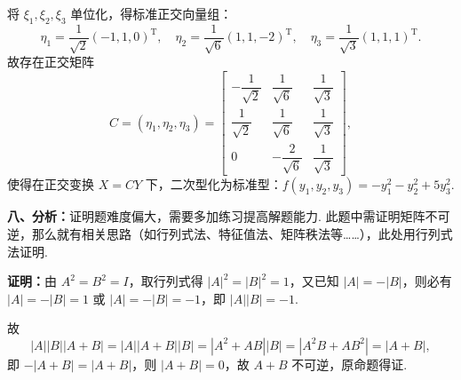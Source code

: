 \documentclass[a4paper,11pt]{ctexart}
\newcommand{\T}{\mathrm{T}}
\begin{document}
将 $\xi_1, \xi_2, \xi_3$ 单位化，得标准正交向量组：
\[
  \eta_1 = \frac{1}{\sqrt{2}}(-1, 1, 0)^{\T},\quad
  \eta_2 = \frac{1}{\sqrt{6}}(1, 1, -2)^{\T},\quad
  \eta_3 = \frac{1}{\sqrt{3}}(1, 1, 1)^{\T}.
\]
故存在正交矩阵
\[
  C = (\eta_1, \eta_2, \eta_3) = \begin{bmatrix}
    -\dfrac{1}{\sqrt{2}} & \dfrac{1}{\sqrt{6}} & \dfrac{1}{\sqrt{3}} \\[0.8em]
    \dfrac{1}{\sqrt{2}} & \dfrac{1}{\sqrt{6}} & \dfrac{1}{\sqrt{3}} \\[0.8em]
    0 & -\dfrac{2}{\sqrt{6}} & \dfrac{1}{\sqrt{3}}
  \end{bmatrix},
\]
使得在正交变换 $X = CY$ 下，二次型化为标准型：$f(y_1, y_2, y_3) = -y_1^2 - y_2^2 + 5y_3^2$.

\vspace{0.8em}

\textbf{八、分析：}证明题难度偏大，需要多加练习提高解题能力. 此题中需证明矩阵不可逆，那么就有相关思路（如行列式法、特征值法、矩阵秩法等……），此处用行列式法证明.

\textbf{证明：}由 $A^2 = B^2 = I$，取行列式得 $|A|^2 = |B|^2 = 1$，又已知 $|A| = -|B|$，则必有 $|A| = -|B| = 1$ 或 $|A| = -|B| = -1$，即 $|A||B| = -1$.

故
\[
  |A||B||A + B| = |A||A + B||B| = |A^2 + AB||B| = |A^2B + AB^2| = |A + B|,
\]
即 $-|A + B| = |A + B|$，则 $|A + B| = 0$，故 $A + B$ 不可逆，原命题得证.
\end{document}
